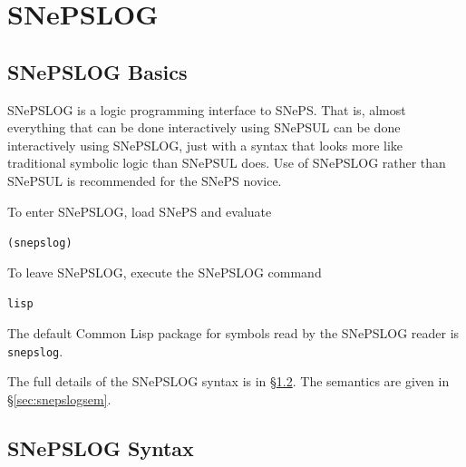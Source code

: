 \documentclass{book}
\begin{document}
\chapter{SNePSLOG}\label{snepslogchap}

\section{SNePSLOG Basics}
SNePSLOG is a logic programming interface to SNePS.  That is, almost
everything that can be done interactively using SNePSUL can be done
interactively using SNePSLOG, just with a syntax that looks more like
traditional symbolic logic than SNePSUL does.  Use of SNePSLOG rather
than SNePSUL is recommended for the SNePS novice.

To enter SNePSLOG, load SNePS and evaluate
\begin{center}
{\tt (snepslog)}
\end{center}
To leave SNePSLOG, execute the SNePSLOG command
\begin{center}
{\tt lisp}
\end{center}

The default Common Lisp package for symbols read by the SNePSLOG
reader is \texttt{snepslog}.

The full details of the SNePSLOG syntax is in \S\ref{sec:snepslogsyn}.  The
semantics are given in \S\ref{sec:snepslogsem}.

\section{SNePSLOG Syntax}\label{sec:snepslogsyn}
\newcommand{\oparen}{\texttt{\underline{(}}}
\newcommand{\cparen}{\texttt{\underline{)}}} 
\end{document}
